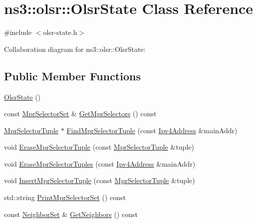 \hypertarget{classns3_1_1olsr_1_1OlsrState}{}\section{ns3\+:\+:olsr\+:\+:Olsr\+State Class Reference}
\label{classns3_1_1olsr_1_1OlsrState}


{\ttfamily \#include $<$olsr-\/state.\+h$>$}



Collaboration diagram for ns3\+:\+:olsr\+:\+:Olsr\+State\+:
\subsection*{Public Member Functions}
\begin{DoxyCompactItemize}
\item 
\hyperlink{classns3_1_1olsr_1_1OlsrState_a9b9352e786286001dfe237af0d163d30}{Olsr\+State} ()
\item 
const \hyperlink{namespacens3_1_1olsr_a320f5a705b7edfac35236d3e28e10e59}{Mpr\+Selector\+Set} \& \hyperlink{classns3_1_1olsr_1_1OlsrState_a2514e58296452650e5fffc4cc7036a8d}{Get\+Mpr\+Selectors} () const 
\item 
\hyperlink{structns3_1_1olsr_1_1MprSelectorTuple}{Mpr\+Selector\+Tuple} $\ast$ \hyperlink{classns3_1_1olsr_1_1OlsrState_a81bb1e9642f6b840094d199d3654b984}{Find\+Mpr\+Selector\+Tuple} (const \hyperlink{classns3_1_1Ipv4Address}{Ipv4\+Address} \&main\+Addr)
\item 
void \hyperlink{classns3_1_1olsr_1_1OlsrState_afef3afa980a9340e4cadc21bb33bc241}{Erase\+Mpr\+Selector\+Tuple} (const \hyperlink{structns3_1_1olsr_1_1MprSelectorTuple}{Mpr\+Selector\+Tuple} \&tuple)
\item 
void \hyperlink{classns3_1_1olsr_1_1OlsrState_a7efa14fb8cbd5cae78180a73f5369854}{Erase\+Mpr\+Selector\+Tuples} (const \hyperlink{classns3_1_1Ipv4Address}{Ipv4\+Address} \&main\+Addr)
\item 
void \hyperlink{classns3_1_1olsr_1_1OlsrState_ad21822ab75e7587b10cee641ca846049}{Insert\+Mpr\+Selector\+Tuple} (const \hyperlink{structns3_1_1olsr_1_1MprSelectorTuple}{Mpr\+Selector\+Tuple} \&tuple)
\item 
std\+::string \hyperlink{classns3_1_1olsr_1_1OlsrState_a54a82f932deb7904e5ec0ffcdd70c8a9}{Print\+Mpr\+Selector\+Set} () const 
\item 
const \hyperlink{namespacens3_1_1olsr_af0afef1f28c6f0a0b528b03b638df05d}{Neighbor\+Set} \& \hyperlink{classns3_1_1olsr_1_1OlsrState_a82d5882ca3fdb93a9c1110c6f176c03c}{Get\+Neighbors} () const 

\end{DoxyCompactItemize}
